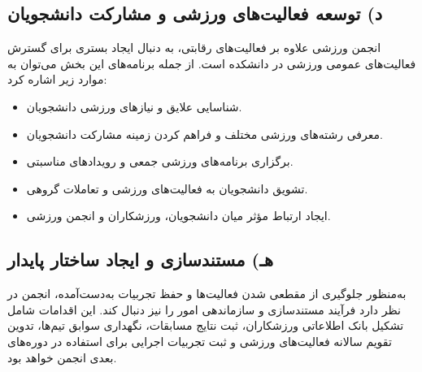\documentclass[12pt,a4paper]{article}
\begin{document}
\subsection*{د) توسعه فعالیت‌های ورزشی و مشارکت دانشجویان}
انجمن ورزشی علاوه بر فعالیت‌های رقابتی، به دنبال ایجاد بستری برای گسترش فعالیت‌های عمومی ورزشی در دانشکده است. از جمله برنامه‌های این بخش می‌توان به موارد زیر اشاره کرد:
\begin{itemize}
    \item شناسایی علایق و نیازهای ورزشی دانشجویان.
    \item معرفی رشته‌های ورزشی مختلف و فراهم کردن زمینه مشارکت دانشجویان.
    \item برگزاری برنامه‌های ورزشی جمعی و رویدادهای مناسبتی.
    \item تشویق دانشجویان به فعالیت‌های ورزشی و تعاملات گروهی.
    \item ایجاد ارتباط مؤثر میان دانشجویان، ورزشکاران و انجمن ورزشی.
\end{itemize}

\subsection*{هـ) مستندسازی و ایجاد ساختار پایدار}
به‌منظور جلوگیری از مقطعی شدن فعالیت‌ها و حفظ تجربیات به‌دست‌آمده، انجمن در نظر دارد فرآیند مستندسازی و سازماندهی امور را نیز دنبال کند. این اقدامات شامل تشکیل بانک اطلاعاتی ورزشکاران، ثبت نتایج مسابقات، نگهداری سوابق تیم‌ها، تدوین تقویم سالانه فعالیت‌های ورزشی و ثبت تجربیات اجرایی برای استفاده در دوره‌های بعدی انجمن خواهد بود.

\end{document}
